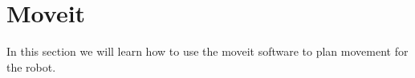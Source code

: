 \section{Moveit}

In this section we will learn how to use the moveit software to plan movement for the robot.